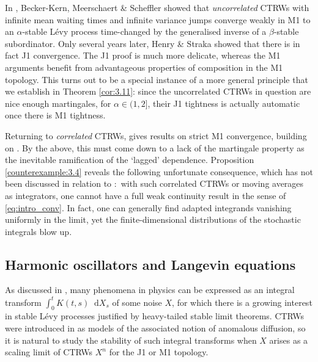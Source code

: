 \documentclass[11pt]{article}
\theoremstyle{definition}\newtheorem{example}[theorem]{Example}
\theoremstyle{definition}\newtheorem{counterexample}[theorem]{Counterexample}
\theoremstyle{definition}\newtheorem{remark}[theorem]{Remark}
\theoremstyle{definition}\newtheorem{defi}[theorem]{Definition}
\numberwithin{equation}{section}
\newcommand*\diff{\mathop{}\!\mathrm{d}}								%
\renewcommand{\|}{\; : \, \;}											%
\begin{document}
In \cite{Becker-Kern,meerschaert}, Becker-Kern, Meerschaert \& Scheffler showed that \emph{uncorrelated} CTRWs with infinite mean waiting times and infinite variance jumps converge weakly in M1 
to an $\alpha$-stable L\'evy process time-changed by the generalised inverse of a $\beta$-stable subordinator. Only several years later, Henry \& Straka \cite{henry_straka} showed that there is in fact J1 convergence. The J1 proof is much more delicate, whereas the M1 arguments benefit from advantageous properties of composition in the M1 topology. This turns out to be a special instance of a more general principle that we establish in Theorem \ref{cor:3.11}: since the uncorrelated CTRWs in question are nice enough martingales, for $\alpha \in (1,2]$, their J1 tightness is actually automatic once there is M1 tightness.

Returning to \emph{correlated} CTRWs, \cite{meerschaert2} gives results on strict M1 convergence, building on \cite{avram}. By the above, this must come down to a lack of the martingale property as the inevitable ramification of the `lagged' dependence. Proposition \ref{counterexample:3.4} reveals the following unfortunate consequence, which has not been discussed in relation to \cite[Example 2]{jakubowski}:~with such correlated CTRWs or moving averages as integrators, one cannot have a full weak continuity result in the sense of \eqref{eq:intro_conv}. In fact, one can generally find adapted integrands vanishing uniformly in the limit, yet the finite-dimensional distributions of the stochastic integrals blow up.


\subsection{Harmonic oscillators and Langevin equations}\label{sect:harmonic_oscillators}



As discussed in \cite{Eliazar_Klafter}, many phenomena in physics can be expressed as an integral transform $\int_{0}^t K(t,s) \diff X_s$ of some noise $X$, for which there is a growing interest in stable L\'evy processes justified by heavy-tailed stable limit theorems. CTRWs were introduced in \cite{Montroll_Weiss} as models of the associated notion of anomalous diffusion, so it is natural to study the stability of such integral transforms when $X$ arises as a scaling limit of CTRWs $X^n$ for the J1 or M1 topology.
\end{document}
